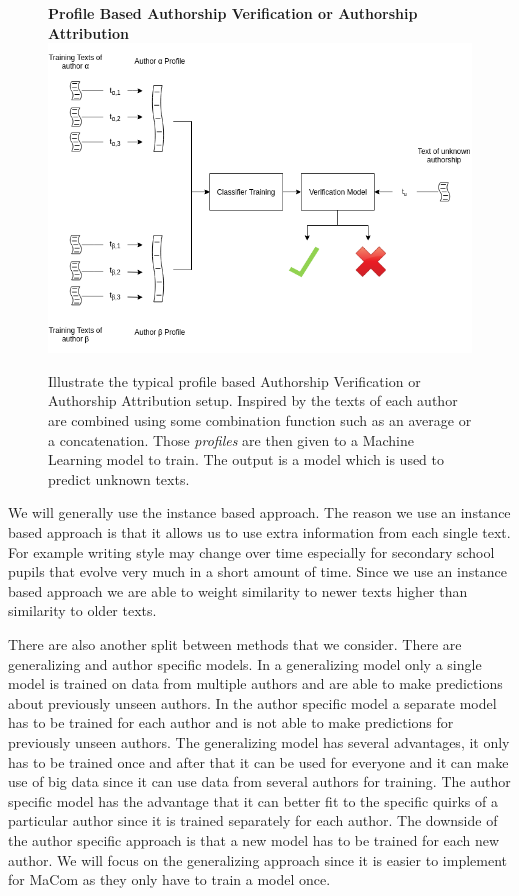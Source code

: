\begin{figure}[htb]
    \centering
    \textbf{Profile Based Authorship Verification or Authorship Attribution}
    \includegraphics[scale=0.5]{./pictures/method/ProfileBased.png}

    \caption{Illustrate the typical profile based Authorship Verification or
    Authorship Attribution setup. Inspired by \cite{stamatos2009} the texts of
    each author are combined using some combination function such as an average
    or a concatenation. Those \textit{profiles} are then given to a Machine
    Learning model to train. The output is a model which is used to predict
    unknown texts. }

    \label{fig:profile_based}
\end{figure}

We will generally use the instance based approach. The reason we use an instance
based approach is that it allows us to use extra information from each single
text. For example writing style may change over time especially for secondary
school pupils that evolve very much in a short amount of time. Since we use an
instance based approach we are able to weight similarity to newer texts higher
than similarity to older texts.

There are also another split between methods that we consider. There are
generalizing and author specific models. In a generalizing model only a single
model is trained on data from multiple authors and are able to make predictions
about previously unseen authors. In the author specific model a separate model
has to be trained for each author and is not able to make predictions for
previously unseen authors. The generalizing model has several advantages, it
only has to be trained once and after that it can be used for everyone and
it can make use of big data since it can use data from several authors for
training. The author specific model has the advantage that it can better fit
to the specific quirks of a particular author since it is trained separately
for each author. The downside of the author specific approach is that a new
model has to be trained for each new author. We will focus on the generalizing
approach since it is easier to implement for MaCom as they only have to train a
model once.


